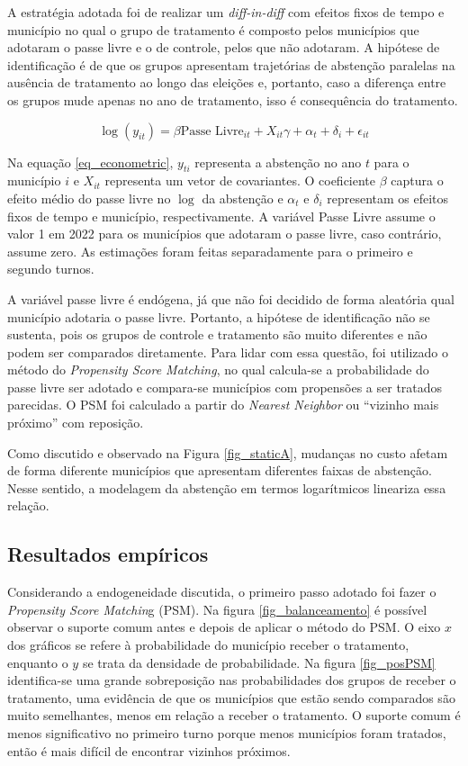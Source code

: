 A estratégia adotada foi de realizar um \textit{diff-in-diff} com efeitos fixos de tempo e município no qual o grupo de tratamento é composto pelos municípios que adotaram o passe livre e o de controle, pelos que não adotaram. A hipótese de identificação é de que os grupos apresentam trajetórias de abstenção paralelas na ausência de tratamento ao longo das eleições e, portanto, caso a diferença entre os grupos mude apenas no ano de tratamento, isso é consequência do tratamento.

\begin{equation}
\label{eq_econometric}
    \log{(y_{it})}=\beta\text{Passe Livre}_{it} + X_{it}\gamma + \alpha_t + \delta_i + \epsilon_{it}
\end{equation}

Na equação \ref{eq_econometric}, $y_{ti}$ representa a abstenção no ano $t$ para o município $i$ e $X_{it}$ representa um vetor de covariantes. O coeficiente $\beta$ captura o efeito médio do passe livre no $\log$ da abstenção e $\alpha_t$ e $\delta_i$ representam os efeitos fixos de tempo e município, respectivamente. A variável Passe Livre assume o valor 1 em 2022 para os municípios que adotaram o passe livre, caso contrário, assume zero. As estimações foram feitas separadamente para o primeiro e segundo turnos. 

A variável passe livre é endógena, já que não foi decidido de forma aleatória qual município adotaria o passe livre. Portanto, a hipótese de identificação não se sustenta, pois os grupos de controle e tratamento são muito diferentes e não podem ser comparados diretamente. Para lidar com essa questão, foi utilizado o método do \textit{Propensity Score Matching}, no qual calcula-se a probabilidade do passe livre ser adotado e compara-se municípios com propensões a ser tratados parecidas. O PSM foi calculado a partir do \textit{Nearest Neighbor} ou ``vizinho mais próximo'' com reposição.

Como discutido e observado na Figura \ref{fig_staticA}, mudanças no custo afetam de forma diferente municípios que apresentam diferentes faixas de abstenção. Nesse sentido, a modelagem da abstenção em termos logarítmicos lineariza essa relação.

\subsection{Resultados empíricos}

Considerando a endogeneidade discutida, o primeiro passo adotado foi fazer o \textit{Propensity Score Matchin}g (PSM). Na figura \ref{fig_balanceamento} é possível observar o suporte comum antes e depois de aplicar o método do PSM. O eixo $x$ dos gráficos se refere à probabilidade do município receber o tratamento, enquanto o $y$ se trata da densidade de probabilidade. Na figura \ref{fig_posPSM} identifica-se uma grande sobreposição nas probabilidades dos grupos de receber o tratamento, uma evidência de que os municípios que estão sendo comparados são muito semelhantes, menos em relação a receber o tratamento. O suporte comum é menos significativo no primeiro turno porque menos municípios foram tratados, então é mais difícil de encontrar vizinhos próximos.


